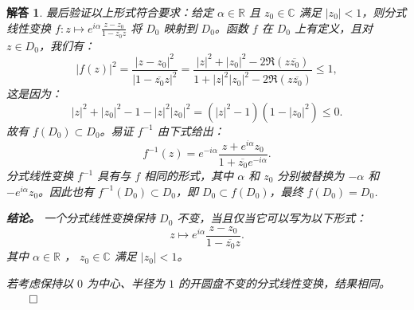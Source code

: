 \documentclass[12pt,UTF8,fontset=none]{ctexbook}
\theoremstyle{exercisestyle}
\theoremstyle{solutionstyle}
\newtheorem*{solution*}{解答}
\newenvironment{solution}
  {\begin{solution*}}
  {\hfill\ensuremath{\qed}\end{solution*}}
\begin{document}
\begin{solution}
最后验证以上形式符合要求：给定 \( \alpha \in \mathbb{R} \) 且 \( z_0 \in \mathbb{C} \) 满足 \( |z_0| < 1 \)，则分式线性变换 \( f: z \mapsto e^{i\alpha} \frac{z - z_0}{1 - \overline{z_0} z} \) 将 \( D_0 \) 映射到 \( D_0 \)。函数 \( f \) 在 \( D_0 \) 上有定义，且对 \( z \in D_0 \)，我们有：
\[
|f(z)|^2 = \frac{|z - z_0|^2}{|1 - \overline{z_0} z|^2} = \frac{|z|^2 + |z_0|^2 - 2 \Re(z \overline{z_0})}{1 + |z|^2 |z_0|^2 - 2 \Re(z \overline{z_0})} \leqslant 1,
\]
这是因为：
\[
|z|^2 + |z_0|^2 - 1 - |z|^2 |z_0|^2 = (|z|^2 - 1)(1 - |z_0|^2) \leqslant 0.
\]
故有 \( f(D_0) \subset D_0 \)。易证 \( f^{-1} \) 由下式给出：
\[
f^{-1}(z) = e^{-i\alpha} \frac{z + e^{i\alpha} z_0}{1 + \overline{z_0} e^{-i\alpha}}.
\]
分式线性变换 \( f^{-1} \) 具有与 \( f \) 相同的形式，其中 \( \alpha \) 和 \( z_0 \) 分别被替换为 \( -\alpha \) 和 \( -e^{i\alpha} z_0 \)。因此也有 \( f^{-1}(D_0) \subset D_0 \)，即 \( D_0 \subset f(D_0) \)，最终 \( f(D_0) = D_0 \).

\textbf{结论。} 一个分式线性变换保持 \( D_0 \) 不变，当且仅当它可以写为以下形式：
\[ z \mapsto e^{i\alpha} \frac{z - z_0}{1 - \overline{z_0} z}. \]
其中 \( \alpha \in \mathbb{R} \) ， \( z_0 \in \mathbb{C} \) 满足 \( |z_0| < 1 \)。

若考虑保持以 \( 0 \) 为中心、半径为 \( 1 \) 的开圆盘不变的分式线性变换，结果相同。
\end{solution}
\end{document}
